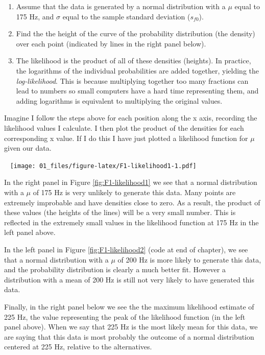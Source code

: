 \documentclass[
]{book}
\begin{document}
\begin{enumerate}
\def\labelenumi{\arabic{enumi})}
\item
  Assume that the data is generated by a normal distribution with a \(\mu\) equal to 175 Hz, and \(\sigma\) equal to the sample standard deviation (\(s_{f0}\)).
\item
  Find the the height of the curve of the probability distribution (the density) over each point (indicated by lines in the right panel below).
\item
  The likelihood is the product of all of these densities (heights). In practice, the logarithms of the individual probabilities are added together, yielding the \emph{log-likelihood}. This is because multiplying together too many fractions can lead to numbers so small computers have a hard time representing them, and adding logarithms is equivalent to multiplying the original values.
\end{enumerate}

Imagine I follow the steps above for each position along the x axis, recording the likelihood values I calculate. I then plot the product of the densities for each corresponding x value. If I do this I have just plotted a likelihood function for \(\mu\) given our data.

~
\texttt{[image: 01\_files/figure-latex/F1-likelihood1-1.pdf]}
~

In the right panel in Figure \ref{fig:F1-likelihood1} we see that a normal distribution with a \(\mu\) of 175 Hz is very unlikely to generate this data. Many points are extremely improbable and have densities close to zero. As a result, the product of these values (the heights of the lines) will be a very small number. This is reflected in the extremely small values in the likelihood function at 175 Hz in the left panel above.

In the left panel in Figure \ref{fig:F1-likelihood2} (code at end of chapter), we see that a normal distribution with a \(\mu\) of 200 Hz is more likely to generate this data, and the probability distribution is clearly a much better fit. However a distribution with a mean of 200 Hz is still not very likely to have generated this data.

Finally, in the right panel below we see the the maximum likelihood estimate of 225 Hz, the value representing the peak of the likelihood function (in the left panel above). When we say that 225 Hz is the most likely mean for this data, we are saying that this data is most probably the outcome of a normal distribution centered at 225 Hz, relative to the alternatives.
\end{document}
